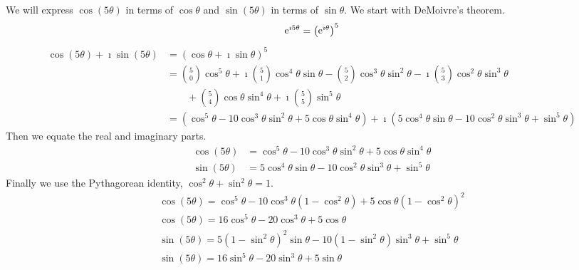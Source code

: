 \begin{Example}
  We will express $\cos(5 \theta)$ in terms of $\cos \theta$ and 
  $\sin(5 \theta)$ in terms of $\sin \theta$.
  We start with DeMoivre's theorem.
  \[
  \mathop{\mathrm{e}}\nolimits^{\imath 5 \theta} = \left( \mathop{\mathrm{e}}\nolimits^{\imath \theta} \right)^5
  \]
  \begin{align*}
    \cos(5 \theta) + \imath \sin(5 \theta)
    &= (\cos \theta + \imath \sin \theta)^5 
    \\
    &= \binom{5}{0} \cos^5 \theta
    + \imath \binom{5}{1} \cos^4 \theta \sin \theta
    - \binom{5}{2} \cos^3 \theta \sin^2 \theta
    - \imath \binom{5}{3} \cos^2 \theta \sin^3 \theta 
    \\
    & \qquad + \binom{5}{4} \cos \theta \sin^4 \theta
    + \imath \binom{5}{5} \sin^5 \theta 
    \\
    &= \left( \cos^5 \theta - 10 \cos^3 \theta \sin^2 \theta + 5 \cos \theta \sin^4 \theta \right)
    + \imath \left( 5 \cos^4 \theta \sin \theta - 10 \cos^2 \theta \sin^3 \theta + \sin^5 \theta \right)
  \end{align*}
  Then we equate the real and imaginary parts.
  \begin{align*}
    \cos(5 \theta) 
    &= \cos^5 \theta - 10 \cos^3 \theta \sin^2 \theta
    + 5 \cos \theta \sin^4 \theta 
    \\
    \sin(5 \theta) &= 5 \cos^4 \theta \sin \theta - 10  \cos^2 \theta \sin^3 \theta + \sin^5 \theta
  \end{align*}
  Finally we use the Pythagorean identity, $\cos^2 \theta + \sin^2 \theta = 1$.
  \begin{gather*} 
    \cos(5 \theta) = \cos^5 \theta - 10 \cos^3 \theta \left( 1 - \cos^2 \theta \right)
    + 5 \cos \theta \left( 1 - \cos^2 \theta \right)^2  
    \\
    \boxed{ 
      \cos(5 \theta) = 16 \cos^5 \theta - 20 \cos^3 \theta + 5 \cos \theta 
      } 
    \\
    \sin(5 \theta) = 5 \left( 1 - \sin^2 \theta \right)^2 \sin \theta 
    - 10 \left( 1 - \sin^2 \theta \right) \sin^3 \theta + \sin^5 \theta
    \\
    \boxed{ 
      \sin(5 \theta) = 16 \sin^5 \theta - 20 \sin^3 \theta + 5 \sin \theta
      } 
  \end{gather*}
\end{Example}
















